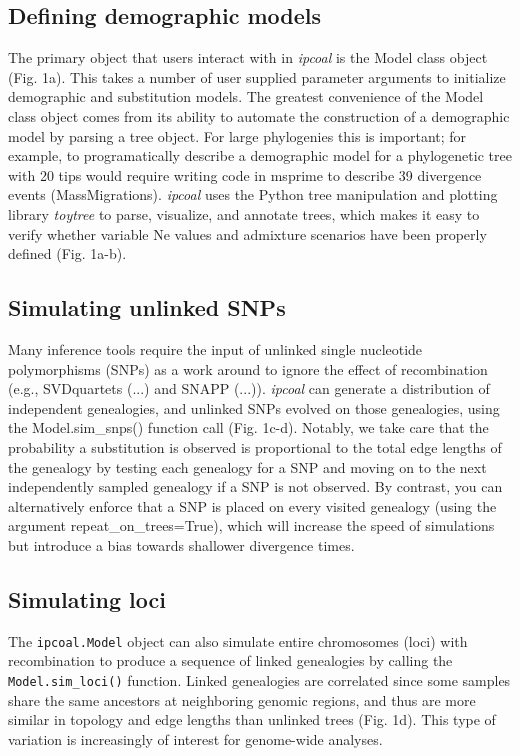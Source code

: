 \documentclass[11pt]{article}
\begin{document}
\subsection{Defining demographic models}
The primary object that users interact with in \emph{ipcoal} is the Model class object (Fig. 1a). This takes a number of user supplied parameter arguments to initialize demographic and substitution models. The greatest convenience of the Model class object comes from its ability to automate the construction of a demographic model by parsing a tree object. For large phylogenies this is important; for example, to programatically describe a demographic model for a phylogenetic tree with 20 tips would require writing code in msprime to describe 39 divergence events (MassMigrations). \emph{ipcoal} uses the Python tree manipulation and plotting library \emph{toytree} \citep{eaton_toytree_2020} to parse, visualize, and annotate trees, which makes it easy to verify whether variable Ne values and admixture scenarios have been properly defined (Fig. 1a-b). 

\subsection{Simulating unlinked SNPs}
Many inference tools require the input of unlinked single nucleotide polymorphisms (SNPs) as a work around to ignore the effect of recombination (e.g., SVDquartets (...) and SNAPP (...)). \emph{ipcoal} can generate a distribution of independent genealogies, and unlinked SNPs evolved on those genealogies, using the Model.sim\_snps() function call (Fig. 1c-d). Notably, we take care that the probability a substitution is observed is proportional to the total edge lengths of the genealogy by testing each genealogy for a SNP and moving on to the next independently sampled genealogy if a SNP is not observed. By contrast, you can alternatively enforce that a SNP is placed on every visited genealogy (using the argument repeat\_on\_trees=True), which will increase the speed of simulations but introduce a bias towards shallower divergence times. 

\subsection{Simulating loci}
The \texttt{ipcoal.Model} object can also simulate entire chromosomes (loci) with recombination to produce a sequence of linked genealogies by calling the \texttt{Model.sim\_loci()} function. Linked genealogies are correlated since some samples share the same ancestors at neighboring genomic regions, and thus are more similar in topology and edge lengths than unlinked trees (Fig. 1d). This type of variation is increasingly of interest for genome-wide analyses.
\end{document}
